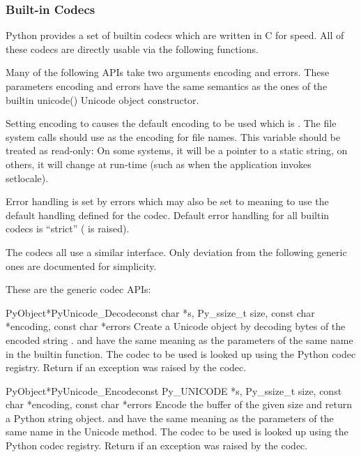\subsubsection{Built-in Codecs \label{builtinCodecs}}

Python provides a set of builtin codecs which are written in C
for speed. All of these codecs are directly usable via the
following functions.

Many of the following APIs take two arguments encoding and
errors. These parameters encoding and errors have the same semantics
as the ones of the builtin unicode() Unicode object constructor.

Setting encoding to \NULL{} causes the default encoding to be used
which is \ASCII.  The file system calls should use
 as the encoding for file
names. This variable should be treated as read-only: On some systems,
it will be a pointer to a static string, on others, it will change at
run-time (such as when the application invokes setlocale).

Error handling is set by errors which may also be set to \NULL{}
meaning to use the default handling defined for the codec.  Default
error handling for all builtin codecs is ``strict''
( is raised).

The codecs all use a similar interface.  Only deviation from the
following generic ones are documented for simplicity.


These are the generic codec APIs:

\begin{cfuncdesc}{PyObject*}{PyUnicode_Decode}{const char *s,
                                               Py_ssize_t size,
                                               const char *encoding,
                                               const char *errors}
  Create a Unicode object by decoding  bytes of the encoded
  string .   and  have the same
  meaning as the parameters of the same name in the
   builtin function.  The codec to be used is
  looked up using the Python codec registry.  Return \NULL{} if an
  exception was raised by the codec.
\end{cfuncdesc}

\begin{cfuncdesc}{PyObject*}{PyUnicode_Encode}{const Py_UNICODE *s,
                                               Py_ssize_t size,
                                               const char *encoding,
                                               const char *errors}
  Encode the  buffer of the given size and return
  a Python string object.   and  have the
  same meaning as the parameters of the same name in the Unicode
   method.  The codec to be used is looked up using
  the Python codec registry.  Return \NULL{} if an exception was
  raised by the codec.
\end{cfuncdesc}


